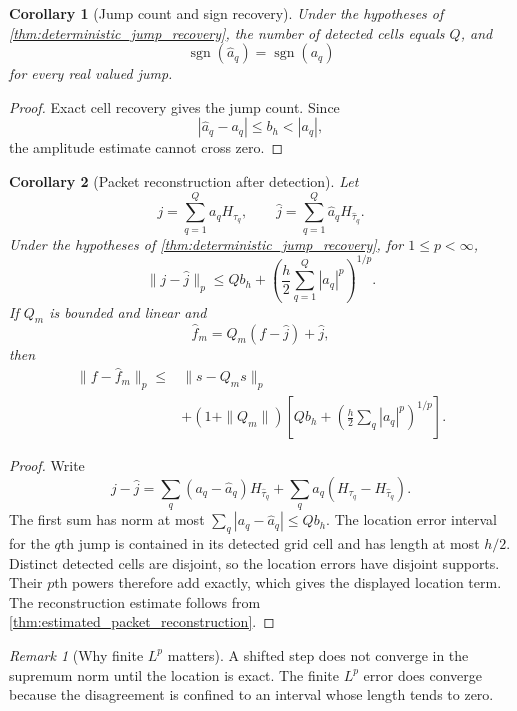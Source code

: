 \documentclass{aomart}
\newtheorem{corollary}[corollary]{Corollary}
\theoremstyle{definition}
\theoremstyle{remark}
\newtheorem{remark}[remark]{Remark}
\newcommand{\sgn}{\operatorname{sgn}}
\begin{document}
\begin{corollary}[Jump count and sign recovery]\label{cor:jump_count_sign}
Under the hypotheses of \cref{thm:deterministic_jump_recovery}, the number of detected cells equals \(Q\), and
\[
\sgn(\widehat a_q)=\sgn(a_q)
\]
for every real valued jump.
\end{corollary}

\begin{proof}
Exact cell recovery gives the jump count. Since
\[
|\widehat a_q-a_q|\leq b_h<|a_q|,
\]
the amplitude estimate cannot cross zero.
\end{proof}

\begin{corollary}[Packet reconstruction after detection]\label{cor:reconstruction_after_detection}
Let
\[
j=\sum_{q=1}^{Q}a_qH_{\tau_q},
\qquad
\widehat j=\sum_{q=1}^{Q}\widehat a_qH_{\widehat\tau_q}.
\]
Under the hypotheses of \cref{thm:deterministic_jump_recovery}, for \(1\leq p<\infty\),
\[
\|j-\widehat j\|_p
\leq
Qb_h
+
\left(
\frac h2\sum_{q=1}^{Q}|a_q|^p
\right)^{1/p}.
\]
If \(Q_m\) is bounded and linear and
\[
\widehat f_m=Q_m(f-\widehat j)+\widehat j,
\]
then
\[
\begin{aligned}
\|f-\widehat f_m\|_p
\leq{}&
\|s-Q_ms\|_p\\
&+(1+\|Q_m\|)
\left[
Qb_h+
\left(
\frac h2\sum_q|a_q|^p
\right)^{1/p}
\right].
\end{aligned}
\]
\end{corollary}

\begin{proof}
Write
\[
j-\widehat j
=
\sum_q(a_q-\widehat a_q)H_{\widehat\tau_q}
+
\sum_q a_q(H_{\tau_q}-H_{\widehat\tau_q}).
\]
The first sum has norm at most \(\sum_q|a_q-\widehat a_q|\leq Qb_h\). The location error interval for the \(q\)th jump is contained in its detected grid cell and has length at most \(h/2\). Distinct detected cells are disjoint, so the location errors have disjoint supports. Their \(p\)th powers therefore add exactly, which gives the displayed location term. The reconstruction estimate follows from \cref{thm:estimated_packet_reconstruction}.
\end{proof}

\begin{remark}[Why finite \(L^p\) matters]\label{rem:finite_p_recovery}
A shifted step does not converge in the supremum norm until the location is exact. The finite \(L^p\) error does converge because the disagreement is confined to an interval whose length tends to zero.
\end{remark}
\end{document}
